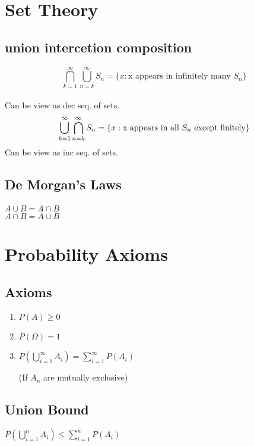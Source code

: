 \section{Set Theory}
    \subsection*{union intercetion composition} 
    \[\bigcap_{k=1}^{\infty} \bigcup_{n=k}^{\infty} S_n =
    \{x : \text{x appears in infinitely many } S_n\} \]\\
    Can be view as dec seq. of sets.\\
    
    \[\bigcup_{k=1}^{\infty} \bigcap_{n=k}^{\infty} S_n = 
    \\ \{x : \text{x appears in all } S_n \text{ except finitely} \} \]
    Can be view as inc seq. of sets.\\

    \subsection*{De Morgan's Laws}
    $\overline{A \cup B} = \overline{A} \cap \overline{B}$\\

    $\overline{A \cap B} = \overline{A} \cup \overline{B}$\\

\section{Probability Axioms}
    \subsection*{Axioms}
    \begin{enumerate}
        \item $P(A) \geq 0$
        \item $P(\Omega) = 1$
        \item $P(\bigcup_{i=1}^{\infty} A_i) = \sum_{i=1}^{\infty} P(A_i)$
        
        (If $A_n$ are mutually exclusive)
    \end{enumerate}

    \subsection*{Union Bound}
        $P(\bigcup_{i=1}^{n} A_i) \leq \sum_{i=1}^{n} P(A_i)$



    